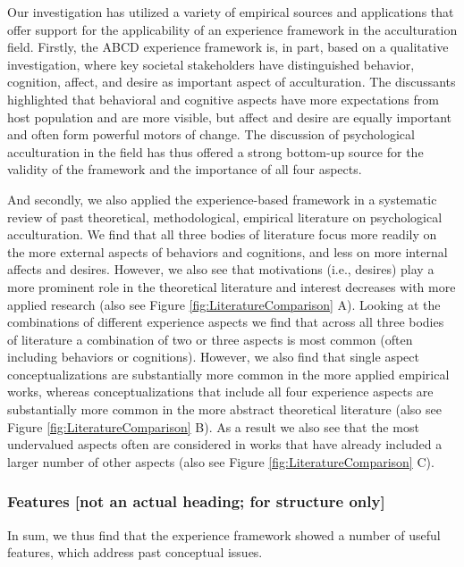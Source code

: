 \documentclass[man, 12pt, a4paper]{apa7}
\begin{document}
Our investigation has utilized a variety of empirical sources and applications that offer support for the applicability of an experience framework in the acculturation field. Firstly, the ABCD experience framework is, in part, based on a qualitative investigation, where key societal stakeholders have distinguished behavior, cognition, affect, and desire as important aspect of acculturation. The discussants highlighted that behavioral and cognitive aspects have more expectations from host population and are more visible, but affect and desire are equally important and often form powerful motors of change. The discussion of psychological acculturation in the field has thus offered a strong bottom-up source for the validity of the framework and the importance of all four aspects.

And secondly, we also applied the experience-based framework in a systematic review of past theoretical, methodological, empirical literature on psychological acculturation. We find that all three bodies of literature focus more readily on the more external aspects of behaviors and cognitions, and less on more internal affects and desires. However, we also see that motivations (i.e., desires) play a more prominent role in the theoretical literature and interest decreases with more applied research (also see Figure \ref{fig:LiteratureComparison} A). Looking at the combinations of different experience aspects we find that across all three bodies of literature a combination of two or three aspects is most common (often including behaviors or cognitions). However, we also find that single aspect conceptualizations are substantially more common in the more applied empirical works, whereas conceptualizations that include all four experience aspects are substantially more common in the more abstract theoretical literature (also see Figure \ref{fig:LiteratureComparison} B). As a result we also see that the most undervalued aspects often are considered in works that have already included a larger number of other aspects (also see Figure 
\ref{fig:LiteratureComparison} C). 

\subsubsection{Features [not an actual heading; for structure only]}
In sum, we thus find that the experience framework showed a number of useful features, which address past conceptual issues. 
\end{document}
